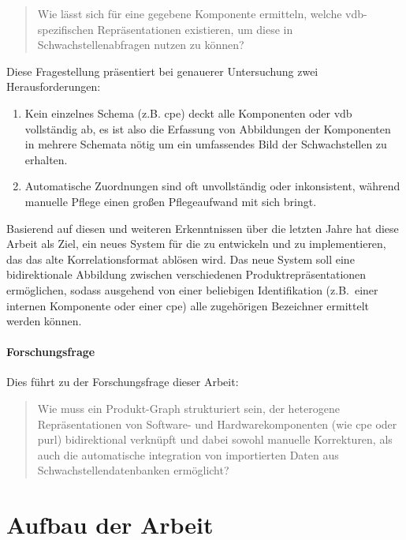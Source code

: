 \begin{quote}
    Wie lässt sich für eine gegebene Komponente ermitteln, welche \acrshort{vdb}-spezifischen Repräsentationen existieren, um diese in Schwachstellenabfragen nutzen zu können?
\end{quote}

Diese Fragestellung präsentiert bei genauerer Untersuchung zwei Herausforderungen:

\begin{enumerate}
    \item Kein einzelnes Schema (z.B. \acrshort{cpe}) deckt alle Komponenten oder \acrshort{vdb} vollständig ab, es ist also die Erfassung von Abbildungen der Komponenten in mehrere Schemata nötig um ein umfassendes Bild der Schwachstellen zu erhalten.
    \item Automatische Zuordnungen sind oft unvollständig oder inkonsistent, während manuelle Pflege einen großen Pflegeaufwand mit sich bringt.
\end{enumerate}

Basierend auf diesen und weiteren Erkenntnissen über die letzten Jahre hat diese Arbeit als Ziel, ein neues System für die \metaeffektsp zu entwickeln und zu implementieren, das das alte Korrelationsformat ablösen wird.
Das neue System soll eine bidirektionale Abbildung zwischen verschiedenen Produktrepräsentationen ermöglichen, sodass ausgehend von einer beliebigen Identifikation (z.B.\ einer internen Komponente oder einer \acrshort{cpe}) alle zugehörigen Bezeichner ermittelt werden können.

\paragraph{Forschungsfrage}

Dies führt zu der Forschungsfrage dieser Arbeit:

\begin{quote}
    Wie muss ein Produkt-Graph strukturiert sein, der heterogene Repräsentationen von Software- und Hardwarekomponenten (wie \acrfull{cpe} oder \acrfull{purl}) bidirektional verknüpft und
    dabei sowohl manuelle Korrekturen, als auch die automatische integration von importierten Daten aus Schwachstellendatenbanken ermöglicht?
\end{quote}


\section{Aufbau der Arbeit}\label{sec:arbeit-aufbau}

